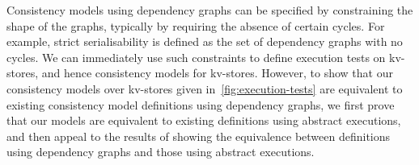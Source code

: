 

Consistency models using dependency graphs can be specified by
constraining the shape of the graphs, typically by requiring the absence of certain cycles.  For example, strict serialisability is defined as
the set of dependency graphs with no cycles. %
We can immediately use such constraints to define execution tests on
kv-stores, and hence consistency models for kv-stores. However, to show 
that our consistency models over kv-stores given in~\cref{fig:execution-tests} are equivalent
to existing consistency model definitions using dependency graphs,
we first prove that our models are equivalent
to existing definitions using abstract executions, and then appeal 
to the results of \citet{laws} showing the equivalence between definitions using dependency graphs and those using abstract executions.  





